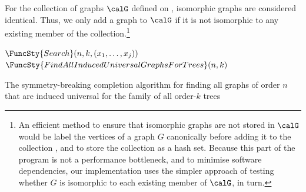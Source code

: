 For the collection of graphs $\calG$ defined on ,
isomorphic graphs are considered identical.  Thus, we only add a graph
to $\calG$ if it is not isomorphic to any existing member of the
collection.\footnote{An efficient method to ensure that isomorphic
graphs are not stored in $\calG$ would be label the vertices
of a graph $G$ canonically before adding it to the collection
\citep{DBLP:journals/jsc/McKayP14}, and to store the collection as a
hash set.  Because this part of the program is not a performance
bottleneck, and to minimise software dependencies, our implementation
uses the simpler approach of testing whether $G$ is isomorphic
to each existing member of $\calG$, in turn.}

\begin{algorithm}[h!]
\DontPrintSemicolon
\nl $\FuncSty{Search}(n,k,(x_1, \dots, x_j))$ \;
\nl {}
\nl {}
\nl {}
\medskip
\nl $\FuncSty{FindAllInducedUniversalGraphsForTrees}(n,k)$ \;
\nl {}
\nl {}
\nl {}
\caption{The symmetry-breaking completion algorithm for finding all graphs of order $n$
    that are induced universal for the family of all order-$k$ trees}
\label{alg:completion}
\end{algorithm}

